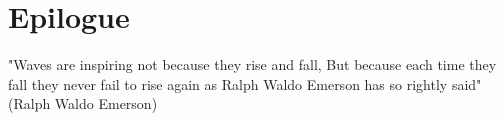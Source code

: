 \chapter*{Epilogue}
\thispagestyle{plain}


"Waves are inspiring not because they rise and fall, But because each time they fall they never fail to rise again as Ralph Waldo Emerson has so rightly said" (Ralph Waldo Emerson)










